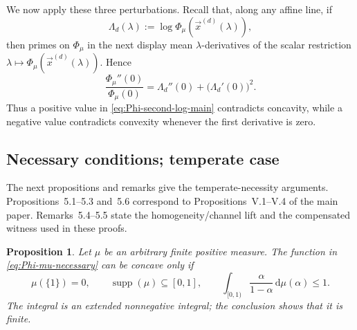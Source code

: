 \documentclass[aps,pra,11pt,onecolumn,nofootinbib,tightenlines]{revtex4-2}
\newtheorem{proposition}[theorem]{Proposition}
\theoremstyle{definition}
\begin{document}
We now apply these three perturbations. Recall that, along any affine line, if
\begin{equation}
 \Lambda_d(\lambda):=
 \log\Phi_\mu(\vec x^{(d)}(\lambda)),
 \label{eq:def-Lambda-d-main}
\end{equation}
then primes on $\Phi_\mu$ in the next display mean $\lambda$-derivatives of
the scalar restriction $\lambda\mapsto
\Phi_\mu(\vec x^{(d)}(\lambda))$.  Hence
\begin{equation}
 \frac{\Phi_\mu''(0)}{\Phi_\mu(0)}
 =\Lambda_d''(0)+\bigl(\Lambda_d'(0)\bigr)^2.
 \label{eq:Phi-second-log-main}
\end{equation}
Thus a positive value in \eqref{eq:Phi-second-log-main} contradicts concavity, while a negative value contradicts convexity whenever the first derivative is zero.

\subsection{Necessary conditions; temperate case}
\label{sec:temperate-necessity}

The next propositions and remarks give the temperate-necessity arguments.
Propositions~5.1--5.3 and~5.6 correspond to Propositions~V.1--V.4 of the main
paper. Remarks~5.4--5.5 state the homogeneity/channel lift and the compensated
witness used in these proofs.

\begin{proposition}
\label{prop:positive-necessary}
Let $\mu$ be an arbitrary finite positive measure. The function in \eqref{eq:Phi-mu-necessary} can be concave only if
\begin{equation}
 \mu(\{1\})=0,
 \qquad
 \operatorname{supp}(\mu)\subseteq[0,1],
 \qquad
 \int_{[0,1)}\frac{\alpha}{1-\alpha}\,\mathrm d\mu(\alpha)
 \leq1.
 \label{eq:positive-necessary-condition}
\end{equation}
The integral is an extended nonnegative integral; the conclusion shows that it is finite.
\end{proposition}
\end{document}
